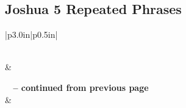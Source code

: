 \subsection{Joshua 5 Repeated Phrases}


\normalsize
 
\begin{center}
\begin{longtable}{|p{3.0in}|p{0.5in}|}
\caption[Joshua 5 Repeated Phrases]{Joshua 5 Repeated Phrases}\label{table:Repeated Phrases Joshua 5} \\
\hline {} &  \\ \hline 
\endfirsthead
 
{{\bfseries \tablename\ \thetable{} -- continued from previous page}} \\  
\hline {} &  \\ \hline 
\endhead
 

\end{longtable}
\end{center}
